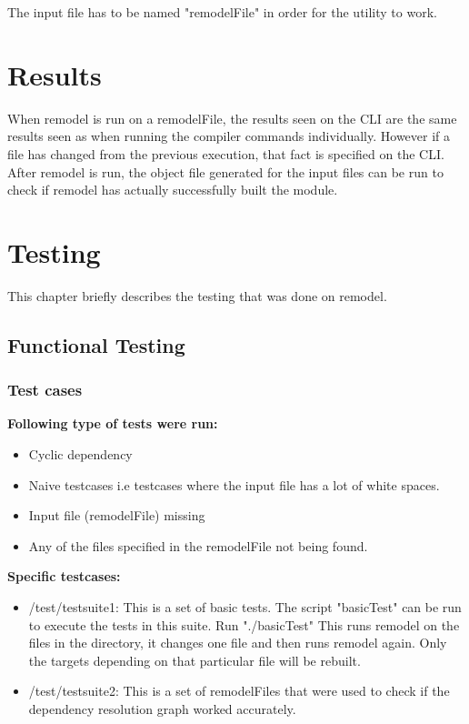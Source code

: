 \documentclass[a4paper, 12pt, notitlepage]{report}
\begin{document}
The input file has to be named "remodelFile" in order for the utility to work.

\chapter{Results}
%
When remodel is run on a remodelFile, the results seen on the CLI are the same results seen as when running the compiler commands individually. However if a file has changed from the previous execution, that fact is specified on the CLI. After remodel is run, the object file generated for the input files can be run to check if remodel has actually successfully built the module.

\chapter{Testing}
%
This chapter briefly describes the testing that was done on remodel.

\section{Functional Testing}
\subsection{Test cases}
\textbf{Following type of tests were run:}
\begin{itemize}
\item Cyclic dependency
\item Naive testcases i.e testcases where the input file has a lot of white spaces.
\item Input file (remodelFile) missing
\item Any of the files specified in the remodelFile not being found.
\end{itemize}


\textbf{Specific testcases:}
\begin{itemize}
\item /test/testsuite1: This is a set of basic tests. The script "basicTest" can be run to execute the tests in this suite. Run "./basicTest" This runs remodel on the files in the directory, it changes one file and then runs remodel again. Only the targets depending on that particular file will be rebuilt.
\item /test/testsuite2: This is a set of remodelFiles that were used to check if the dependency resolution graph worked accurately.
\end{itemize}
\end{document}
